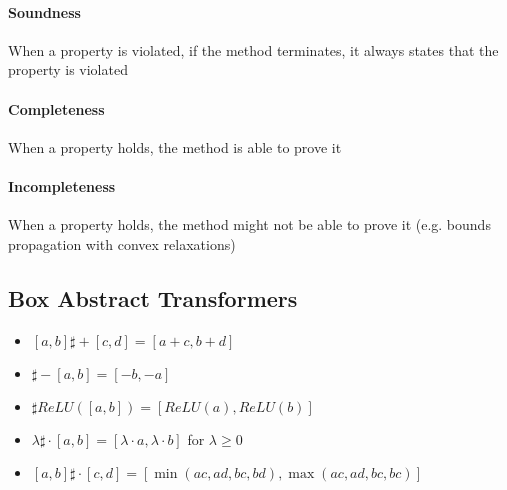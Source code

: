 \paragraph{Soundness} When a  property is violated, if the method terminates, it always states that the property is violated
\paragraph{Completeness} When a property holds, the method is able to prove it
\paragraph{Incompleteness} When a property holds, the method might not be able to prove it (e.g. bounds propagation with convex relaxations)
\subsection*{Box Abstract Transformers}
\begin{itemize}
    \item $[a, b] \sharp{+} [c, d] = [a+c, b+d]$
    \item $\sharp{-} [a, b] = [-b, -a]$
    \item $\sharp{ReLU}([a, b]) = [ReLU(a), ReLU(b)]$
    \item $\lambda \sharp{\cdot} [a, b] = [\lambda \cdot a, \lambda \cdot b]$ for $\lambda \ge 0$
    \item $[a, b] \sharp{\cdot} [c, d] = [\min(ac, ad, bc, bd), \max(ac, ad, bc, bc)]$
\end{itemize}
